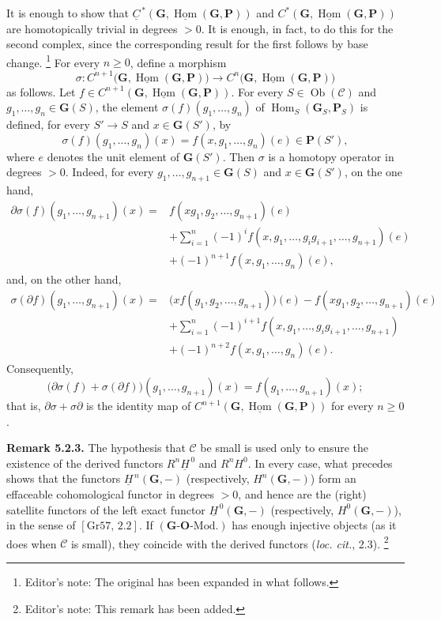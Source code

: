 It is enough to show that
\(\underline C^{\,*}
  (\mathbf G,\underline{\operatorname{Hom}}(\mathbf G,\mathbf P))\) and
\(C^*(\mathbf G,\underline{\operatorname{Hom}}(\mathbf G,\mathbf P))\)
are homotopically trivial in degrees \(>0\). It is enough, in fact, to do
this for the second complex, since the corresponding result for the first
follows by base change.
\footnote{Editor's note: The original has been expanded in what follows.}
For every \(n\geq0\), define a morphism
\[
  \sigma:
  C^{n+1}\bigl(
    \mathbf G,\underline{\operatorname{Hom}}(\mathbf G,\mathbf P)
  \bigr)
  \longrightarrow
  C^n\bigl(
    \mathbf G,\underline{\operatorname{Hom}}(\mathbf G,\mathbf P)
  \bigr)
\]
as follows. Let
\(f\in C^{n+1}
  (\mathbf G,\underline{\operatorname{Hom}}(\mathbf G,\mathbf P))\).
For every \(S\in\operatorname{Ob}(\mathscr C)\) and
\(g_1,\ldots,g_n\in\mathbf G(S)\), the element
\(\sigma(f)(g_1,\ldots,g_n)\) of
\(\operatorname{Hom}_S(\mathbf G_S,\mathbf P_S)\) is defined, for every
\(S'\to S\) and \(x\in\mathbf G(S')\), by
\[
  \sigma(f)(g_1,\ldots,g_n)(x)
    =f(x,g_1,\ldots,g_n)(e)\in\mathbf P(S'),
\]
where \(e\) denotes the unit element of \(\mathbf G(S')\). Then \(\sigma\)
is a homotopy operator in degrees \(>0\). Indeed, for every
\(g_1,\ldots,g_{n+1}\in\mathbf G(S)\) and \(x\in\mathbf G(S')\), on the
one hand,
\begin{align*}
  \partial\sigma(f)(g_1,\ldots,g_{n+1})(x)
    ={}&f(xg_1,g_2,\ldots,g_{n+1})(e)\\
     &+\sum_{i=1}^{n}(-1)^i
       f(x,g_1,\ldots,g_i g_{i+1},\ldots,g_{n+1})(e)\\
     &+(-1)^{n+1}f(x,g_1,\ldots,g_n)(e),
\end{align*}
and, on the other hand,
\begin{align*}
  \sigma(\partial f)(g_1,\ldots,g_{n+1})(x)
    ={}&\bigl(xf(g_1,g_2,\ldots,g_{n+1})\bigr)(e)
       -f(xg_1,g_2,\ldots,g_{n+1})(e)\\
     &+\sum_{i=1}^{n}(-1)^{i+1}
       f(x,g_1,\ldots,g_i g_{i+1},\ldots,g_{n+1})\\
     &+(-1)^{n+2}f(x,g_1,\ldots,g_n)(e).
\end{align*}
Consequently,
\[
  \bigl(\partial\sigma(f)+\sigma(\partial f)\bigr)
    (g_1,\ldots,g_{n+1})(x)
  =f(g_1,\ldots,g_{n+1})(x);
\]
that is, \(\partial\sigma+\sigma\partial\) is the identity map of
\(C^{n+1}
  (\mathbf G,\underline{\operatorname{Hom}}(\mathbf G,\mathbf P))\) for
every \(n\geq0\).

\medskip
\noindent\textbf{Remark 5.2.3.}
The hypothesis that \(\mathscr C\) be small is used only to ensure the
existence of the derived functors \(R^n\underline H^{\,0}\) and \(R^nH^0\).
In every case, what precedes shows that the functors
\(\underline H^{\,n}(\mathbf G,-)\) (respectively,
\(H^n(\mathbf G,-)\)) form an effaceable cohomological functor in degrees
\(>0\), and hence are the (right) satellite functors of the left exact
functor \(\underline H^{\,0}(\mathbf G,-)\) (respectively,
\(H^0(\mathbf G,-)\)), in the sense of \([\mathrm{Gr}57,\,2.2]\). If
\((\mathbf G\text{-}\mathbf O\text{-Mod.})\) has enough injective objects
(as it does when \(\mathscr C\) is small), they coincide with the derived
functors (\emph{loc. cit.}, 2.3).
\footnote{Editor's note: This remark has been added.}

